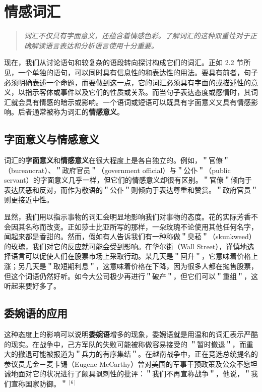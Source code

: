 \section{情感词汇}

\begin{quotation}
\textit{词汇不仅具有字面意义，还蕴含着情感色彩。了解词汇的这种双重性对于正确解读语言表达和分析语言使用十分重要。}
\end{quotation}

现在，我们从讨论语句和较复杂的语段转向探讨构成它们的词汇。正如 2.2 节所见，一个单独的语句，可以同时具有信息性的和表达性的用法。要具有前者，句子必须明确表述一个命题，而要做到这一点，它的词汇必须具有字面的或描述性的意义，以指示客体或事件以及它们的性质或关系。而当句子表达态度或感情时，其词汇就会具有情感的暗示或影响。一个语词或短语可以既具有字面意义又具有情感影响。后者通常被称为词汇的\textbf{情感意义}。

\subsection{字面意义与情感意义}

词汇的\textbf{字面意义}和\textbf{情感意义}在很大程度上是各自独立的。例如，＂官僚＂（bureaucrat）、＂政府官员＂（government official）与＂公仆＂（public servant）的字面意义几乎一样，但它们的情感意义却很有区别。＂官僚＂倾向于表达厌恶和反对，而作为敬语的＂公仆＂则倾向于表达尊重和赞赏。＂政府官员＂则更接近中性。

显然，我们用以指示事物的词汇会明显地影响我们对事物的态度。花的实际芳香不会因其名称而改变。正如莎士比亚所写的那样，一朵玫瑰不论使用其他任何名字，闻起来都是香甜的。然而，假如有人告诉我们有一种称做＂臭菘＂（skunkweed）的玫瑰，我们对它的反应就可能会受到影响。在华尔街（Wall Street），谨慎地选择语言可以促使人们在股票市场上采取行动。某几天是＂回升＂，它意味着价格上涨；另几天是＂取短期利息＂，这意味着价格在下降，因为很多人都在抛售股票，但这个词语仍然好听。如今大公司极少再进行＂破产＂，但它们可以＂重组＂，这听起来要好多了。

\subsection{委婉语的应用}

这种态度上的影响可以说明\textbf{委婉语}增多的现象，委婉语就是用温和的词汇表示严酷的现实。在战争中，己方军队的失败可能被称做容易接受的 ＂暂时撤退＂，而重大的撤退可能被报道为＂兵力的有序集结＂。在越南战争中，正在竞选总统提名的参议员尤金－麦卡锡（Eugene McCarthy）曾对美国的军事干预政策及公众不愿坦诚地面对它的状况进行了颇具讽刺性的批评：＂我们不再宣称战争＂，他说，＂我们宣称国家防御。＂$^{[6]}$

